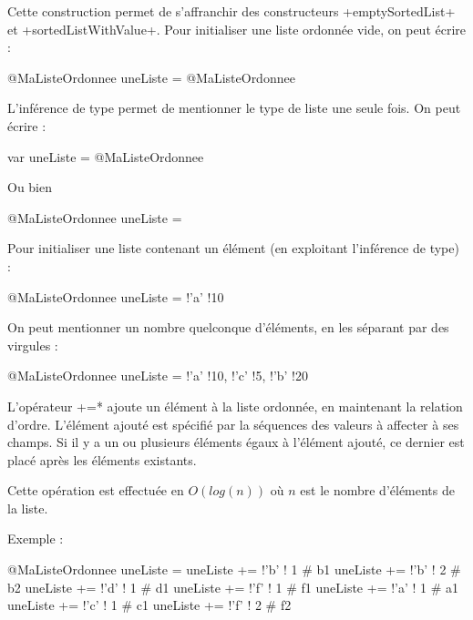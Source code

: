 
Cette construction permet de s'affranchir des constructeurs \ggsq+emptySortedList+ et \ggsq+sortedListWithValue+. Pour initialiser une liste ordonnée vide, on peut écrire :

\begin{galgas4}
@MaListeOrdonnee uneListe = @MaListeOrdonnee {}
\end{galgas4}

L'inférence de type permet de mentionner le type de liste une seule fois. On peut écrire :
\begin{galgas4}
var uneListe = @MaListeOrdonnee {}
\end{galgas4}

Ou bien
\begin{galgas4}
@MaListeOrdonnee uneListe = {}
\end{galgas4}


Pour initialiser une liste contenant un élément (en exploitant l'inférence de type) :
\begin{galgas4}
@MaListeOrdonnee uneListe = {!'a' !10}
\end{galgas4}

On peut mentionner un nombre quelconque d'éléments, en les séparant par des virgules :
\begin{galgas4}
@MaListeOrdonnee uneListe = {!'a' !10, !'c' !5, !'b' !20}
\end{galgas4}





L'opérateur \ggsq*+=* ajoute un élément à la liste ordonnée, en maintenant la relation d'ordre. L'élément ajouté est spécifié par la séquences des valeurs à affecter à ses champs. Si il y a un ou plusieurs éléments égaux à l'élément ajouté, ce dernier est placé après les éléments existants.


Cette opération est effectuée en $O(log (n))$ où $n$ est le nombre d'éléments de la liste.

Exemple :

\begin{galgas4}
@MaListeOrdonnee uneListe = {}
uneListe += !'b' ! 1 # b1
uneListe += !'b' ! 2 # b2
uneListe += !'d' ! 1 # d1
uneListe += !'f' ! 1 # f1
uneListe += !'a' ! 1 # a1
uneListe += !'c' ! 1 # c1
uneListe += !'f' ! 2 # f2
\end{galgas4}

